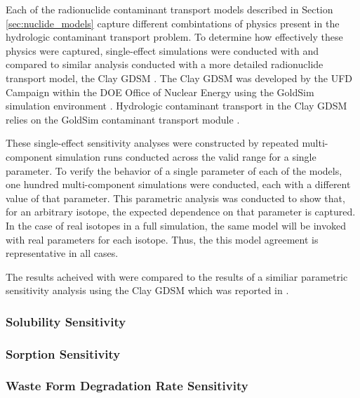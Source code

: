 
Each of the radionuclide contaminant transport models described in Section
\ref{sec:nuclide_models} capture different combintations of physics present in
the hydrologic contaminant transport problem. To determine how effectively
these physics were captured, single-effect simulations were conducted with
\Cyder and compared to similar analysis \cite{huff_key_2012} conducted with a
more detailed radionuclide transport model, the Clay \gls{GDSM}
\cite{clayton_generic_2011}. The Clay \gls{GDSM} was developed by the \gls{UFD}
Campaign within the \gls{DOE} Office of Nuclear Energy using the GoldSim
simulation environment \cite{golder_associates_goldsim_2010}. Hydrologic
contaminant transport in the Clay \gls{GDSM} relies on the GoldSim contaminant
transport module \cite{golder_associates_goldsim_2010-1}.

These single-effect sensitivity analyses were constructed by repeated
multi-component simulation runs conducted across the valid range for a single
parameter. To verify the behavior of a single parameter of each of the \Cyder
models, one hundred multi-component simulations were conducted, each with a
different value of that parameter.  This parametric analysis was conducted to
show that, for an arbitrary isotope, the expected dependence on that parameter
is captured. In the case of real isotopes in a full simulation, the same model
will be invoked with real parameters for each isotope. Thus, the this model
agreement is representative in all cases.

The results acheived with \Cyder were compared to the results of a similiar
parametric sensitivity analysis using the Clay \gls{GDSM} which was reported in
\cite{huff_key_2012}.

\subsubsection{Solubility Sensitivity}

\FloatBarrier
\subsubsection{Sorption Sensitivity}

\FloatBarrier
\subsubsection{Waste Form Degradation Rate Sensitivity}

\FloatBarrier
